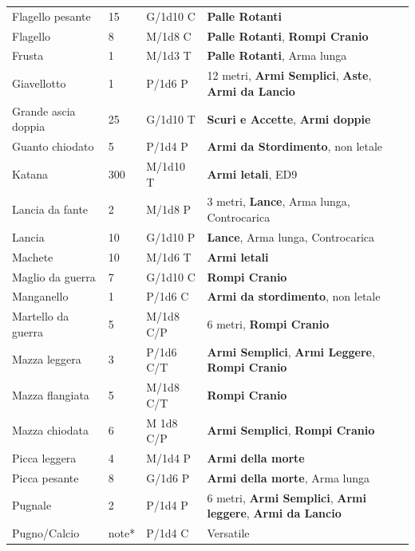 \begin{xltabular}{\linewidth}{lllX}
Flagello pesante& 15 & G/1d10 C& \textbf{Palle Rotanti}\\
Flagello& 8& M/1d8 C& \textbf{Palle Rotanti}, \textbf{Rompi Cranio}\\
Frusta& 1& M/1d3 T& \textbf{Palle Rotanti}, Arma lunga\\
Giavellotto& 1& P/1d6 P& 12 metri, \textbf{Armi Semplici}, \textbf{Aste}, \textbf{Armi da Lancio}\\
Grande ascia doppia& 25 & G/1d10 T& \textbf{Scuri e Accette}, \textbf{Armi doppie}\\
Guanto chiodato& 5& P/1d4 P&\textbf{Armi da Stordimento}, non letale\\
Katana& 300& M/1d10 T& \textbf{Armi letali}, ED9\\
Lancia da fante& 2& M/1d8 P&3 metri, \textbf{Lance}, Arma lunga, Controcarica\\
Lancia& 10 & G/1d10 P&\textbf{Lance}, Arma lunga, Controcarica\\
Machete& 10 & M/1d6 T&\textbf{Armi letali}\\
Maglio da guerra& 7& G/1d10 C& \textbf{Rompi Cranio}\\
Manganello& 1& P/1d6 C& \textbf{Armi da stordimento}, non letale\\
Martello da guerra& 5& M/1d8 C/P& 6 metri, \textbf{Rompi Cranio}\\
Mazza leggera& 3& P/1d6 C/T& \textbf{Armi Semplici}, \textbf{Armi Leggere}, \textbf{Rompi Cranio} \\
Mazza flangiata& 5& M/1d8 C/T& \textbf{Rompi Cranio}\\
Mazza chiodata& 6& M 1d8 C/P& \textbf{Armi Semplici}, \textbf{Rompi Cranio}\\
Picca leggera& 4& M/1d4 P&\textbf{Armi della morte}\\
Picca pesante& 8& G/1d6 P&\textbf{Armi della morte}, Arma lunga\\
Pugnale& 2& P/1d4 P& 6 metri, \textbf{Armi Semplici}, \textbf{Armi leggere}, \textbf{Armi da Lancio}\\
Pugno/Calcio & note*& P/1d4 C&Versatile\\

\end{xltabular}
